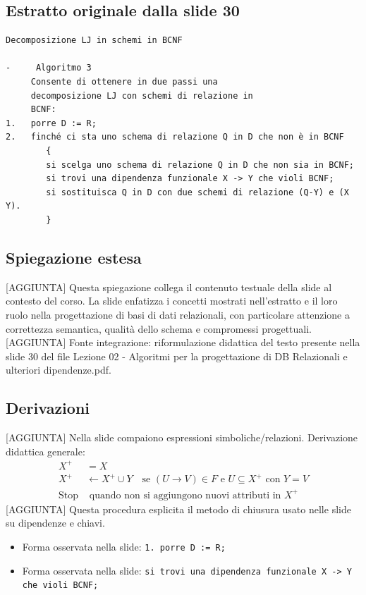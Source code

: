 \documentclass[11pt]{article}
\begin{document}
\subsection*{Estratto originale dalla slide 30}
\begin{lstlisting}
Decomposizione LJ in schemi in BCNF

-     Algoritmo 3
     Consente di ottenere in due passi una
     decomposizione LJ con schemi di relazione in
     BCNF:
1.   porre D := R;
2.   finché ci sta uno schema di relazione Q in D che non è in BCNF
        {
        si scelga uno schema di relazione Q in D che non sia in BCNF;
        si trovi una dipendenza funzionale X -> Y che violi BCNF;
        si sostituisca Q in D con due schemi di relazione (Q-Y) e (X   Y).
        }
\end{lstlisting}
\subsection*{Spiegazione estesa}
[AGGIUNTA] Questa spiegazione collega il contenuto testuale della slide al contesto del corso. La slide enfatizza i concetti mostrati nell'estratto e il loro ruolo nella progettazione di basi di dati relazionali, con particolare attenzione a correttezza semantica, qualità dello schema e compromessi progettuali.
[AGGIUNTA] Fonte integrazione: riformulazione didattica del testo presente nella slide 30 del file Lezione 02 - Algoritmi per la progettazione di DB Relazionali e ulteriori dipendenze.pdf.
\subsection*{Derivazioni}
[AGGIUNTA] Nella slide compaiono espressioni simboliche/relazioni. Derivazione didattica generale:
\begin{align*}
X^+ &= X \\
X^+ &\leftarrow X^+ \cup Y \quad \text{se } (U \to V) \in F \text{ e } U \subseteq X^+ \text{ con } Y=V \\
\text{Stop} &\text{ quando non si aggiungono nuovi attributi in } X^+
\end{align*}
[AGGIUNTA] Questa procedura esplicita il metodo di chiusura usato nelle slide su dipendenze e chiavi.
\begin{itemize}[leftmargin=*]
\item Forma osservata nella slide: \texttt{1.   porre D := R;}
\item Forma osservata nella slide: \texttt{si trovi una dipendenza funzionale X -> Y che violi BCNF;}
\end{itemize}
\end{document}
